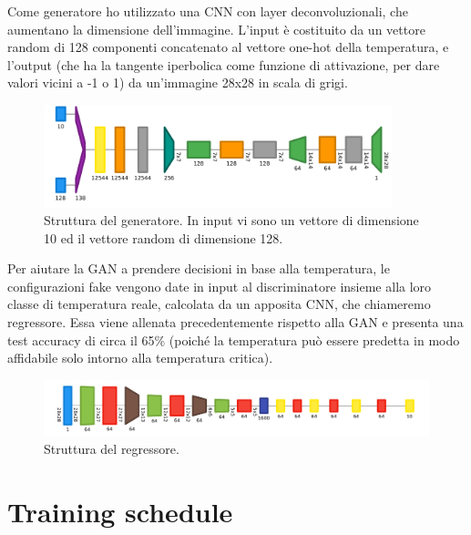 \documentclass[Lau, noexaminfo, oneside]{sapthesis} %
\begin{document}
Come generatore ho utilizzato una CNN con layer deconvoluzionali, che aumentano la dimensione dell'immagine. L'input è costituito da un vettore random di 128 componenti concatenato al vettore one-hot della temperatura, e l'output (che ha la tangente iperbolica come funzione di attivazione, per dare valori vicini a -1 o 1) da un'immagine 28x28 in scala di grigi.
\begin{figure}[H]
\includegraphics[width=0.9\textwidth]{gen.png}
\centering
\caption{Struttura del generatore. In input vi sono un vettore di dimensione 10 ed il vettore random di dimensione 128.}
\end{figure}
Per aiutare la GAN a prendere decisioni in base alla temperatura, le configurazioni fake vengono date in input al discriminatore insieme alla loro classe di temperatura reale, calcolata da un apposita CNN, che chiameremo regressore. Essa viene allenata precedentemente rispetto alla GAN e presenta una test accuracy di circa il 65\% (poiché la temperatura può essere predetta in modo affidabile solo intorno alla temperatura critica).
\begin{figure}[H]
\includegraphics[width=\textwidth]{reg.png}
\centering
\caption{Struttura del regressore.}
\end{figure}
\section{Training schedule}
\end{document}
